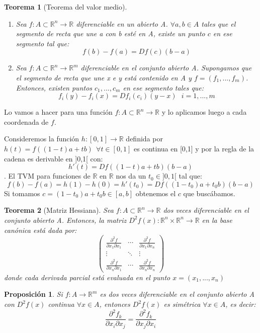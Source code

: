 \documentclass[11pt, a4paper]{article}
\makeatletter
\renewenvironment{proof}[1][\proofname] {\vspace{-15pt}\par\pushQED{\qed}\normalfont\topsep6\p@\@plus6\p@\relax\trivlist\item[\hskip\labelsep\it#1\@addpunct{.}]\ignorespaces}{\popQED\endtrivlist\@endpefalse}
\newcommand{\R}{\mathbb{R}}
\theoremstyle{theorem-style}
\newtheorem*{nth}{Teorema}
\newtheorem*{nprop}{Proposición}
\theoremstyle{definition-style}
\theoremstyle{remark-style}
\theoremstyle{example-style}
\newenvironment{nlist}
{\begin{enumerate}
\renewcommand\labelenumi{(\emph{\roman{enumi})}}}
{\end{enumerate}}
\makeatother
\begin{document}
\begin{nth}[Teorema del valor medio]\hfill\\
	\begin{nlist}
	\item Sea $f:A \subset \R^n\to \R$ diferenciable en un abierto A. $\forall a,b \in A$ tales que el segmento de recta que une a con b esté en A, existe un punto $c$ en ese segmento tal que:
	\[
	f(b)-f(a) = Df(c)(b-a)
	\]
	\item Sea $f:A \subset \R^n \to \R^m$ diferenciable en el conjunto abierto A. Supongamos que el segmento de recta que une x e y está contenido en A y $f=(f_1,...,f_m)$. Entonces, existen puntos $c_1,...,c_m$ en ese segmento tales que:
	\[
	f_i(y) - f_i(x) = Df_i(c_i)(y-x) \ \ \ i = 1,...,m
	\]
\end{nlist}
\end{nth}
\begin{proof}
	Lo vamos a hacer para una función $f:A \subset \R^n \to \R$ y lo aplicamos luego a cada coordenada de $f$.
	
	Consideremos la función $h:[0,1] \to \R$ definida por $h(t) = f((1-t)a +tb) \ \ \forall t \in [0,1]$ es continua en [0,1] y por la regla de la cadena es derivable en ]0,1[ con:
	\[
	h'(t) = Df((1-t)a +tb)(b-a)
	\].
	El TVM para funciones de $\R$ en $\R$ nos da un $t_0 \in ]0,1[$ tal que:
	\[
	f(b)-f(a) = h(1)-h(0) = h'(t_0) = Df((1-t_0)a+t_0b)(b-a)
	\]
	Si tomamos $c=(1-t_0)a+t_0b \in [a,b]$ obtenemos el $c$ que buscábamos.
	
\end{proof}

\begin{nth}[Matriz Hessiana]
	Sea $f:A\subset \R^n \to \R$ dos veces diferenciable en el conjunto abierto A. Entonces, la matriz $D^2f(x): \R^n\times\R^n \to \R$ en la base canónica está dada por:
	\[
	\begin{pmatrix}
 \frac{\partial^2 f}{\partial x_1 \partial x_1} & \cdots & \frac{\partial^2 f}{\partial x_1\partial x_n} \\
 \vdots & \ddots&\vdots \\
 \frac{\partial^2 f}{\partial x_n \partial x_1} & \cdots & \frac{\partial^2 f}{\partial x_n \partial x_n}
\end{pmatrix} 
	\]
	donde cada derivada parcial está evaluada en el punto $x=(x_1,...,x_n)$
\end{nth}

\begin{nprop}
	Si $f:A \to \R^m$ es dos veces diferenciable en el conjunto abierto A con $D^2 f(x)$ continua $\forall x\in A$, entonces $D^2f(x)$ es simétrica $\forall x \in A$, es decir:
	\[
	\frac{\partial^2 f_k}{\partial x_i \partial x_j} =  \frac{\partial^2 f_k}{\partial x_j \partial x_i}
	\]
\end{nprop}
\end{document}
